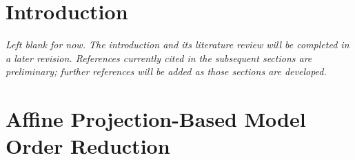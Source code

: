 \documentclass[11pt]{article}
\begin{document}
\vspace{-0.8em}

\section{Introduction}
\label{sec:introduction}
\noindent\emph{Left blank for now.  The introduction and its literature
review will be completed in a later revision.  References currently cited
in the subsequent sections are preliminary; further references will be
added as those sections are developed.}

\section{Affine Projection-Based Model Order Reduction}
\label{sec:projection-framework}
\end{document}
